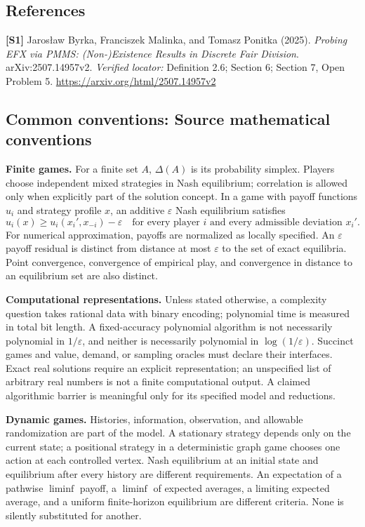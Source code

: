 \documentclass[11pt,a4paper]{article}
\begin{document}
\subsection*{References}
\begingroup\footnotesize\raggedright
\textbf{[S1]} Jarosław Byrka, Franciszek Malinka, and Tomasz Ponitka (2025). \emph{Probing EFX via PMMS: (Non-)Existence Results in Discrete Fair Division}. arXiv:2507.14957v2. \textit{Verified locator:} Definition 2.6; Section 6; Section 7, Open Problem 5. \url{https://arxiv.org/html/2507.14957v2}
\par\endgroup

\subsection*{Common conventions: Source mathematical conventions}

\textbf{Finite games.} For a finite set $A$, $\Delta(A)$ is its probability
simplex. Players choose independent mixed strategies in Nash equilibrium;
correlation is allowed only when explicitly part of the solution concept.
In a game with payoff functions $u_i$ and strategy profile $x$, an additive
$\varepsilon$ Nash equilibrium satisfies
\[
 u_i(x)\geq u_i(x_i',x_{-i})-\varepsilon
 \quad\text{for every player $i$ and every admissible deviation $x_i'$}.
\]
For numerical approximation, payoffs are normalized as locally specified.
An $\varepsilon$ payoff residual is distinct from distance at most
$\varepsilon$ to the set of exact equilibria. Point convergence, convergence
of empirical play, and convergence in distance to an equilibrium set are
also distinct.

\textbf{Computational representations.} Unless stated otherwise, a complexity
question takes rational data with binary encoding; polynomial time is measured
in total bit length. A fixed-accuracy polynomial algorithm is not necessarily
polynomial in $1/\varepsilon$, and neither is necessarily polynomial in
$\log(1/\varepsilon)$. Succinct games and value, demand, or sampling oracles
must declare their interfaces. Exact real solutions require an explicit
representation; an unspecified list of arbitrary real numbers is not a
finite computational output. A claimed algorithmic barrier is meaningful
only for its specified model and reductions.

\textbf{Dynamic games.} Histories, information, observation, and allowable
randomization are part of the model. A stationary strategy depends only on
the current state; a positional strategy in a deterministic graph game
chooses one action at each controlled vertex. Nash equilibrium at an initial
state and equilibrium after every history are different requirements.
An expectation of a pathwise $\liminf$ payoff, a $\liminf$ of expected averages,
a limiting expected average, and a uniform finite-horizon equilibrium are
different criteria. None is silently substituted for another.
\end{document}
